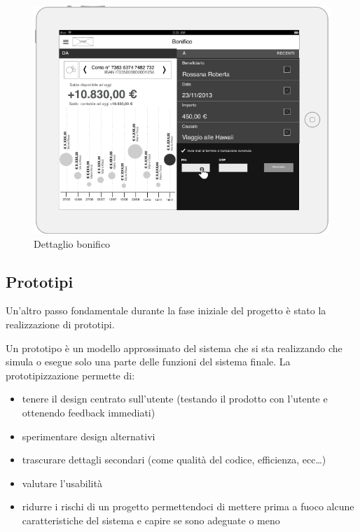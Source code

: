\begin{figure}[!htbp]
\centering
\includegraphics[scale=1.0]{primo_wireframe/bonifico2.png}
\caption{Dettaglio bonifico}
\end{figure}

\newpage
\subsection{Prototipi}
Un'altro passo fondamentale durante la fase iniziale del progetto è stato la realizzazione di prototipi.

Un prototipo è un modello approssimato del sistema che si sta realizzando che simula o esegue solo una parte delle funzioni del sistema finale.
La prototipizzazione permette di:

\begin{itemize}
  \item tenere il design centrato sull’utente (testando il prodotto con l'utente e ottenendo feedback immediati)
  \item sperimentare design alternativi
  \item trascurare dettagli secondari (come qualità del codice, efficienza, ecc\dots) 
  \item valutare l'usabilità
  \item ridurre i rischi di un progetto permettendoci di mettere prima a fuoco alcune caratteristiche del sistema e capire se sono adeguate o meno
\end{itemize}

